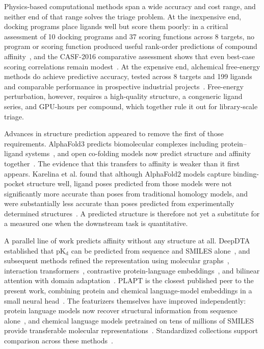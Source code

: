 \documentclass[times, twoside]{zHenriquesLab-StyleBioRxiv}
\newcommand{\pl}{protein--ligand\xspace}
\newcommand{\pkd}{\ensuremath{\mathrm{pK_d}}\xspace}
\begin{document}
Physics-based computational methods span a wide accuracy and cost range, and neither end of that range solves the triage problem. At the inexpensive end, docking programs place ligands well but score them poorly: in a critical assessment of 10 docking programs and 37 scoring functions across 8 targets, no program or scoring function produced useful rank-order predictions of compound affinity~\cite{warren2006critical}, and the CASF-2016 comparative assessment shows that even best-case scoring correlations remain modest~\cite{su2019casf2016}. At the expensive end, alchemical free-energy methods do achieve predictive accuracy, tested across 8 targets and 199 ligands~\cite{wang2015fep} and comparable performance in prospective industrial projects~\cite{schindler2020largescale}. Free-energy perturbation, however, requires a high-quality structure, a congeneric ligand series, and GPU-hours per compound, which together rule it out for library-scale triage.

Advances in structure prediction appeared to remove the first of those requirements. AlphaFold3 predicts biomolecular complexes including \pl systems~\cite{abramson2024alphafold3}, and open co-folding models now predict structure and affinity together~\cite{wohlwend2024boltz1,passaro2025boltz2,corso2023diffdock}. The evidence that this transfers to affinity is weaker than it first appears. Karelina et al. found that although AlphaFold2 models capture binding-pocket structure well, ligand poses predicted from those models were not significantly more accurate than poses from traditional homology models, and were substantially less accurate than poses predicted from experimentally determined structures~\cite{karelina2023alphafold}. A predicted structure is therefore not yet a substitute for a measured one when the downstream task is quantitative.

A parallel line of work predicts affinity without any structure at all. DeepDTA established that \pkd can be predicted from sequence and SMILES alone~\cite{ozturk2018deepdta}, and subsequent methods refined the representation using molecular graphs~\cite{nguyen2021graphdta}, interaction transformers~\cite{huang2021moltrans}, contrastive protein-language embeddings~\cite{singh2023conplex}, and bilinear attention with domain adaptation~\cite{bai2023drugban}. PLAPT is the closest published peer to the present work, combining protein and chemical language-model embeddings in a small neural head~\cite{rose2024plapt}. The featurizers themselves have improved independently: protein language models now recover structural information from sequence alone~\cite{lin2023esm2,esmc2024}, and chemical language models pretrained on tens of millions of SMILES provide transferable molecular representations~\cite{chithrananda2020chemberta,ahmad2022chemberta2}. Standardized collections support comparison across these methods~\cite{huang2021tdc}.
\end{document}
